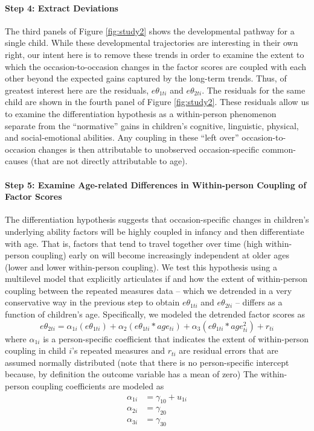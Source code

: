\documentclass[man, floatsintext]{apa7}
\begin{document}
\paragraph{Step 4: Extract Deviations}
The third panels of Figure \ref{fig:study2} shows the developmental
pathway for a single child. While these developmental trajectories are
interesting in their own right, our intent here is to remove these
trends in order to examine the extent to which the occasion-to-occasion
changes in the factor scores are coupled with each other beyond the
expected gains captured by the long-term trends. Thus, of greatest
interest here are the residuals, $e\theta_{1ti}$ and
$e\theta_{2ti}$. The residuals for the same child are shown in the
fourth panel of Figure \ref{fig:study2}. These residuals allow us to
examine the differentiation hypothesis as a within-person phenomenon
separate from the ``normative'' gains in children's cognitive,
linguistic, physical, and social-emotional abilities. Any coupling in
these ``left over'' occasion-to-occasion changes is then attributable to
unobserved occasion-specific common-causes (that are not directly
attributable to age).

\paragraph{Step 5: Examine Age-related Differences in Within-person
Coupling of Factor
Scores}
The differentiation hypothesis suggests that occasion-specific changes
in children's underlying ability factors will be highly coupled in
infancy and then differentiate with age. That is, factors that
tend to travel together over time (high within-person coupling) early on
will become increasingly independent at older ages (lower and lower
within-person coupling). We test this hypothesis using a multilevel
model that explicitly articulates if and how the extent of within-person
coupling between the repeated measures data -- which we detrended in a
very conservative way in the previous step to obtain $e\theta_{1ti}$
and $e\theta_{2ti}$ -- differs as a function of children's age.
Specifically, we modeled the detrended factor scores as \begin{equation}
e\theta_{2ti} = \alpha_{1i}(e\theta_{1ti}) + \alpha_{2}(e\theta_{1ti} * age_{ti}) + \alpha_{3}(e\theta_{1ti} * age^2_{ti}) + r_{ti}
\end{equation} where $\alpha_{1i}$ is a person-specific coefficient
that indicates the extent of within-person coupling in child $i$'s
repeated measures and $r_{ti}$ are residual errors that are assumed
normally distributed (note that there is no person-specific intercept
because, by definition the outcome variable has a mean of zero) The
within-person coupling coefficients are modeled as 
\begin{align}
\alpha_{1i} &= \gamma_{10} + u_{1i} \\
\alpha_{2i} &= \gamma_{20} \\ 
\alpha_{3i} &= \gamma_{30} 
\end{align} 
\end{document}
